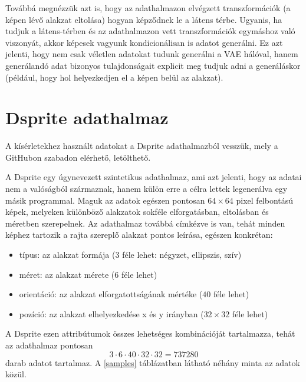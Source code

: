 Továbbá megnézzük azt is, hogy az adathalmazon elvégzett transzformációk (a képen lévő alakzat eltolása) hogyan képződnek le a látens térbe. Ugyanis, ha tudjuk a látens-térben és az adathalmazon vett transzformációk egymáshoz való viszonyát, akkor képesek vagyunk kondicionálisan is adatot generálni. Ez azt jelenti, hogy nem csak véletlen adatokat tudunk generálni a VAE hálóval, hanem generálandó adat bizonyos tulajdonságait explicit meg tudjuk adni a generáláskor (például, hogy hol helyezkedjen el a képen belül az alakzat).

\section{Dsprite adathalmaz}

A kísérletekhez használt adatokat a Dsprite adathalmazból vesszük, mely a GitHubon szabadon elérhető, letölthető.

A Dsprite egy úgynevezett szintetikus adathalmaz, ami azt jelenti, hogy az adatai nem a valóságból származnak, hanem külön erre a célra lettek legenerálva egy másik programmal. Maguk az adatok egészen pontosan $64\times64$ pixel felbontású képek, melyeken különböző alakzatok sokféle elforgatásban, eltolásban és méretben szerepelnek. Az adathalmaz továbbá címkézve is van, tehát minden képhez tartozik a rajta szereplő alakzat pontos leírása, egészen konkrétan:

\begin{itemize}
  \item típus: az alakzat formája ($3$ féle lehet: négyzet, ellipszis, szív)
  \item méret: az alakzat mérete ($6$ féle lehet)
  \item orientáció: az alakzat elforgatottságának mértéke ($40$ féle lehet)
  \item pozíció: az alakzat elhelyezkedése x és y irányban ($32\times32$ féle lehet)
\end{itemize}

A Dsprite ezen attribútumok összes lehetséges kombinációját tartalmazza, tehát az adathalmaz pontosan
$$ 3\cdot6\cdot40\cdot32\cdot32= 737280$$
darab adatot tartalmaz. A \ref{samples} táblázatban látható néhány minta az adatok közül.

